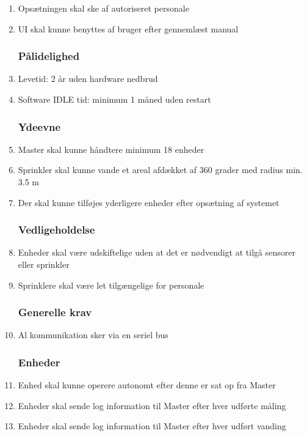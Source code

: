 \begin{enumerate}

\subsubsection*{Brugbarhed}
\item Opsætningen skal ske af autoriseret personale
\item UI skal kunne benyttes af bruger efter gennemlæst manual


\subsubsection*{Pålidelighed}
\item Levetid: 2 år uden hardware nedbrud
\item Software IDLE tid: minimum 1 måned uden restart


\subsubsection*{Ydeevne}
\item Master skal kunne håndtere minimum 18 enheder
\item Sprinkler skal kunne vande et areal afdækket af 360 grader med radius min. 3.5 m 
\item Der skal kunne tilføjes yderligere enheder efter opsætning af systemet


\subsubsection*{Vedligeholdelse}
\item Enheder skal være udskiftelige uden at det er nødvendigt at tilgå sensorer eller sprinkler
\item Sprinklere skal være let tilgængelige for personale


\subsubsection*{Generelle krav}
\item Al kommunikation sker via en seriel bus 


\subsubsection*{Enheder}
\item Enhed skal kunne operere autonomt efter denne er sat op fra Master
\item Enheder skal sende log information til Master efter hver udførte måling
\item Enheder skal sende log information til Master efter hver udført vanding

\end{enumerate}

